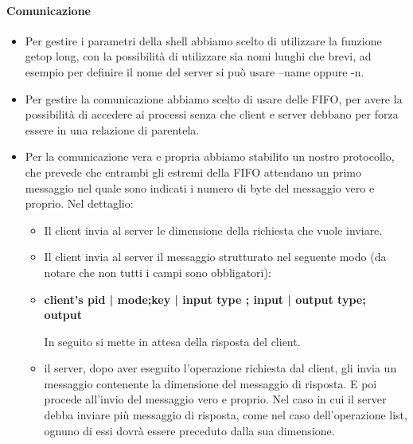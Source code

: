 \documentclass[12pt]{article}
\begin{document}
\paragraph{Comunicazione}
\begin{itemize}
	\item Per gestire i parametri della shell abbiamo scelto di utilizzare la funzione getop long, con la possibilità di utilizzare sia nomi lunghi che brevi, ad esempio per definire il nome del server si può usare --name oppure -n.
	\item Per gestire la comunicazione abbiamo scelto di usare delle FIFO, per avere la possibilità di accedere ai processi senza che client e server debbano per forza essere in una relazione di parentela.
	\item Per la comunicazione vera e propria abbiamo stabilito un nostro protocollo, che prevede che entrambi gli estremi della FIFO attendano un primo messaggio nel quale sono indicati i numero di byte del messaggio vero e proprio. Nel dettaglio:
		\begin{itemize}
			\item Il client invia al server le dimensione della richiesta che vuole inviare.
			\item Il client invia al server il messaggio strutturato nel seguente modo (da notare che non tutti i campi sono obbligatori):
			\item[] \begin{center}
			\textbf{client's pid | mode;key | input type ; input | output type; output}
			\end{center}
			In seguito si mette in attesa della risposta del client.
			\item il server, dopo aver eseguito l'operazione richiesta dal client, gli invia un messaggio contenente la dimensione del messaggio di risposta. E poi procede all'invio del messaggio vero e proprio. Nel caso in cui il server debba inviare più messaggio di risposta, come nel caso dell'operazione list, ognuno di essi dovrà essere preceduto dalla sua dimensione.
		\end{itemize}
\end{itemize}
\end{document}
